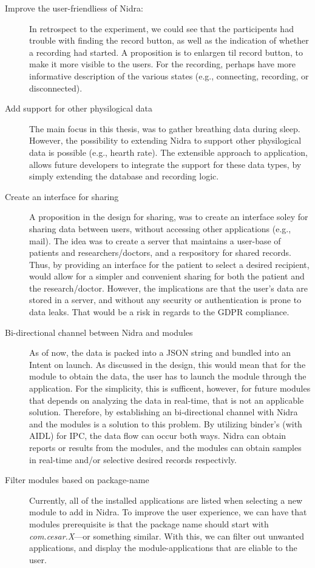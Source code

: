 \begin{description}
    \item[Improve the user-friendliess of Nidra:] In retrospect to the experiment, we could see that the participents had trouble with finding the record button, as well as the indication of whether a recording had started. A proposition is to enlargen til record button, to make it more visible to the users. For the recording, perhaps have more informative description of the various states (e.g., connecting, recording, or disconnected). 
    \item[Add support for other physilogical data] The main focus in this thesis, was to gather breathing data during sleep. However, the possibility to extending Nidra to support other physilogical data is possible (e.g., hearth rate). The extensible approach to application, allows future developers to integrate the support for these data types, by simply extending the database and recording logic. 
    \item[Create an interface for sharing] A proposition in the design for sharing, was to create an interface soley for sharing data between users, without accessing other applications (e.g., mail). The idea was to create a server that maintains a user-base of patients and researchers/doctors, and a respository for shared records. Thus, by providing an interface for the patient to select a desired recipient, would allow for a simpler and convenient sharing for both the patient and the research/doctor. However, the implications are that the user's data are stored in a server, and without any security or authentication is prone to data leaks. That would be a risk in regards to the GDPR compliance.
    \item[Bi-directional channel between Nidra and modules] As of now, the data is packed into a JSON string and bundled into an Intent on launch. As discussed in the design, this would mean that for the module to obtain the data, the user has to launch the module through the application. For the simplicity, this is sufficent, however, for future modules that depends on analyzing the data in real-time, that is not an applicable solution. Therefore, by establishing an bi-directional channel with Nidra and the modules is a solution to this problem. By utilizing binder's (with AIDL) for IPC, the data flow can occur both ways. Nidra can obtain reports or results from the modules, and the modules can obtain samples in real-time and/or selective desired records respectivly. 
    \item[Filter modules based on package-name] Currently, all of the installed applications are listed when selecting a new module to add in Nidra. To improve the user experience, we can have that modules prerequisite is that the package name should start with \textit{com.cesar.X}---or something similar. With this, we can filter out unwanted applications, and display the module-applications that are eliable to the user.
\end{description}